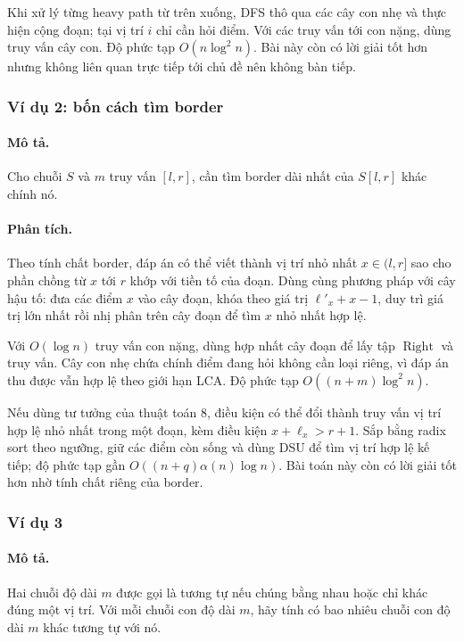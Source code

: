 \documentclass[11pt]{article}
\begin{document}
Khi xử lý từng heavy path từ trên xuống, DFS thô qua các cây con nhẹ và thực
hiện cộng đoạn; tại vị trí $i$ chỉ cần hỏi điểm. Với các truy vấn tới con nặng,
dùng truy vấn cây con. Độ phức tạp $O(n\log^2 n)$. Bài này còn có lời giải tốt
hơn nhưng không liên quan trực tiếp tới chủ đề nên không bàn tiếp.

\subsubsection{Ví dụ 2: bốn cách tìm border}

\paragraph{Mô tả.}
Cho chuỗi $S$ và $m$ truy vấn $[l,r]$, cần tìm border dài nhất của $S[l,r]$ khác
chính nó.

\paragraph{Phân tích.}
Theo tính chất border, đáp án có thể viết thành vị trí nhỏ nhất $x\in(l,r]$ sao
cho phần chồng từ $x$ tới $r$ khớp với tiền tố của đoạn. Dùng cùng phương pháp
với cây hậu tố: đưa các điểm $x$ vào cây đoạn, khóa theo giá trị $\ell'_x+x-1$,
duy trì giá trị lớn nhất rồi nhị phân trên cây đoạn để tìm $x$ nhỏ nhất hợp lệ.

Với $O(\log n)$ truy vấn con nặng, dùng hợp nhất cây đoạn để lấy tập
\(\operatorname{Right}\) và truy vấn. Cây con nhẹ chứa chính điểm đang hỏi không
cần loại riêng, vì đáp án thu được vẫn hợp lệ theo giới hạn LCA. Độ phức tạp
$O((n+m)\log^2 n)$.

Nếu dùng tư tưởng của thuật toán 8, điều kiện có thể đổi thành truy vấn vị trí
hợp lệ nhỏ nhất trong một đoạn, kèm điều kiện $x+\ell_x>r+1$. Sắp bằng radix
sort theo ngưỡng, giữ các điểm còn sống và dùng DSU để tìm vị trí hợp lệ kế
tiếp; độ phức tạp gần $O((n+q)\alpha(n)\log n)$. Bài toán này còn có lời giải
tốt hơn nhờ tính chất riêng của border.

\subsubsection{Ví dụ 3}

\paragraph{Mô tả.}
Hai chuỗi độ dài $m$ được gọi là tương tự nếu chúng bằng nhau hoặc chỉ khác đúng
một vị trí. Với mỗi chuỗi con độ dài $m$, hãy tính có bao nhiêu chuỗi con độ dài
$m$ khác tương tự với nó.
\end{document}
